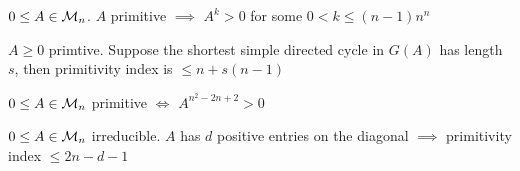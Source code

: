 \documentclass[aspectratio=169]{beamer}
\begin{document}
\begin{frame}
\begin{theorem}
$0\leq A\in \mathcal{M}_n$. $A$ primitive $\implies$ $A^k>0$ for some $0<k\leq (n-1)n^n$
\end{theorem}
\vfill
\begin{theorem}
$A\geq 0$ primtive. Suppose the shortest simple directed cycle in $G(A)$ has length $s$, then primitivity index is $\leq n+s(n-1)$
\end{theorem}
\vfill
\begin{theorem}
$0\leq A\in \mathcal{M}_n$ primitive $\iff$ $A^{n^2-2n+2}>0$
\end{theorem}
\vfill
\begin{theorem}
	$0\leq A\in \mathcal{M}_n$ irreducible. $A$ has $d$ positive entries on the diagonal $\implies$ primitivity index $\leq 2n-d-1$
\end{theorem}
\end{frame}
\end{document}
